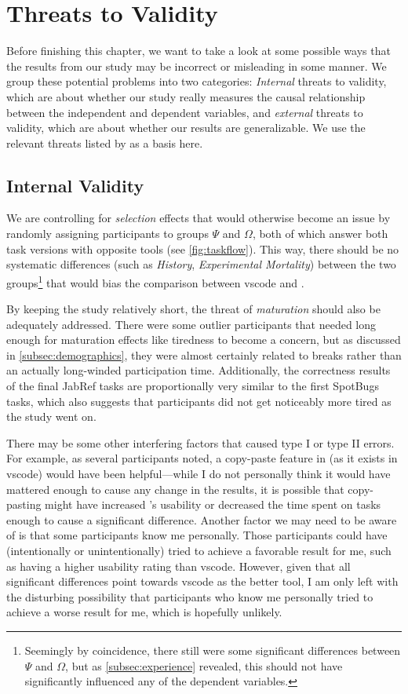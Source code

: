 \documentclass[../thesis]{subfiles}
\begin{document}
\section{Threats to Validity}\label{sec:threats}
Before finishing this chapter, we want to take a look at some possible ways that the results from our study may be incorrect or misleading in some manner.
We group these potential problems into two categories:
\emph{Internal} threats to validity, which are about whether our study really measures the causal relationship between the independent and dependent variables, and \emph{external} threats to validity, which are about whether our results are generalizable.
We use the relevant threats listed by \textcite{campbell1963} as a basis here.

\subsection{Internal Validity}
We are controlling for \emph{selection} effects that would otherwise become an issue by randomly assigning participants to groups $\Psi$ and $\Omega$, both of which answer both task versions with opposite tools (see \cref{fig:taskflow}).
This way, there should be no systematic differences (such as \emph{History}, \emph{Experimental Mortality}) between the two groups\footnote{
	Seemingly by coincidence, there still were some significant differences between $\Psi$ and $\Omega$, but as \cref{subsec:experience} revealed, this should not have significantly influenced any of the dependent variables.
} that would bias the comparison between \gls{vscode} and \SEE{}.

By keeping the study relatively short, the threat of \emph{maturation} should also be adequately addressed.
There were some outlier participants that needed long enough for maturation effects like tiredness to become a concern, but as discussed in \cref{subsec:demographics}, they were almost certainly related to breaks rather than an actually long-winded participation time.
Additionally, the correctness results of the final JabRef tasks are proportionally very similar to the first SpotBugs tasks, which also suggests that participants did not get noticeably more tired as the study went on.

There may be some other interfering factors that caused type I or type II errors.
For example, as several participants noted, a copy-paste feature in \SEE{} (as it exists in \gls{vscode}) would have been helpful---while I do not personally think it would have mattered enough to cause any change in the results, it is possible that copy-pasting might have increased \SEE{}'s usability or decreased the time spent on tasks enough to cause a significant difference.
Another factor we may need to be aware of is that some participants know me personally.
Those participants could have (intentionally or unintentionally) tried to achieve a favorable result for me, such as \SEE{} having a higher usability rating than \gls{vscode}.
However, given that all significant differences point towards \gls{vscode} as the better tool, I am only left with the disturbing possibility that participants who know me personally tried to achieve a worse result for me, which is hopefully unlikely.
\end{document}
